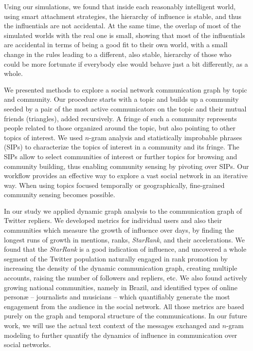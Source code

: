 \documentclass[10pt,oneside]{memoir}
\begin{document}
\begin{Spacing}{2}
Using our simulations, we found that inside each reasonably intelligent world, using smart attachment strategies, the hierarchy of influence is stable, and thus the influentials are not accidental.  At the same time, the overlap of most of the simulated worlds with the real one is small, showing that most of the influentials are accidental in terms of being a good fit to their own world, with a small change in the rules leading to a different, also stable, hierarchy of those who could be more fortunate if everybody else would behave just a bit differently, as a whole.


We presented methods to explore a social network communication graph by topic and community. Our procedure starts with a topic and builds up a community seeded by a pair of the most active communicators on the topic and their mutual friends (triangles), added recursively. A fringe of such a community represents people related to those organized around the topic, but also pointing to other topics of interest. We used $n$-gram analysis and statistically improbable phrases (SIPs) to characterize the topics of interest in a community and its fringe. The SIPs allow to select communities of interest or further topics for browsing and community building, thus enabling community sensing by pivoting over SIPs. Our workflow provides an effective way to explore a vast social network in an iterative way. When using topics focused temporally or geographically, fine-grained community sensing becomes possible.


In our study we applied dynamic graph analysis to the communication graph of Twitter repliers.  We developed metrics for individual users and also their communities which measure the growth of influence over days, by finding the longest runs of growth in mentions, ranks, \emph{StarRank}, and their accelerations.  We found that the \emph{StarRank} is a good indication of influence, and uncovered a whole segment of the Twitter population naturally engaged in rank promotion by increasing the density of the dynamic communication graph, creating multiple accounts, raising the number of followers and repliers, etc.  We also found actively growing national communities, namely in Brazil, and identified types of online personæ -- journalists and musicians -- which quantifiably generate the most engagement from the audience in the social network.  All those metrics are based purely on the graph and temporal structure of the communications.  In our future work, we will use the actual text context of the messages exchanged and $n$-gram modeling to further quantify the dynamics of influence in communication over social networks.



\end{Spacing}
\end{document}
